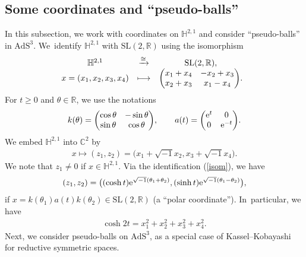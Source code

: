 \documentclass[pdftex]{sigma}
\numberwithin{equation}{section}
\begin{document}
\subsection{Some coordinates and ``pseudo-balls''}
In this subsection, we work with coordinates on $\mathbb{H}^{2,1}$ and
consider ``pseudo-balls'' in $\mathrm{AdS}^{3}$. We~identify
$\mathbb{H}^{2,1}$ with $\mathrm{SL}(2,\mathbb{R})$ using the isomorphism
\begin{align}
\begin{array}{@{}ccc}
\mathbb{H}^{2,1} & \xrightarrow{\cong} & \mathrm{SL}(2,\mathbb{R}), \\
x=(x_1,x_2,x_3,x_4) & \longmapsto & \begin{pmatrix}
x_1 + x_4 & -x_2 + x_3 \\
x_2 + x_3 & x_1 -x_4
\end{pmatrix}\!.\label{isom}
\end{array}
\end{align}
For $t\geq0$ and $\theta\in\mathbb{R}$, we use the notations
\begin{gather}
\label{k-a}
k(\theta) = \begin{pmatrix}
\cos\theta & -\sin\theta \\
\sin\theta & \cos\theta
\end{pmatrix}\!,\qquad
a(t) = \begin{pmatrix}
{\rm e}^t & 0 \\
0 & {\rm e}^{-t}
\end{pmatrix}\!.
\end{gather}
We embed $\mathbb{H}^{2,1}$ into $\mathbb{C}^{2}$ by
\begin{gather}
\label{embed}
x\mapsto (z_1,z_2) = \big(x_1 + \sqrt{-1}x_2, x_3 + \sqrt{-1}x_4\big).
\end{gather}
We note that $z_{1}\neq0$ if $x\in\mathbb{H}^{2,1}$.
Via the identification (\ref{isom}), we have
\begin{gather}
\label{polar}
(z_1,z_2) = \big((\cosh t){\rm e}^{\sqrt{-1}(\theta_1+\theta_2)},
(\sinh t){\rm e}^{\sqrt{-1}(\theta_1-\theta_2)}\big),
\end{gather}
if $x = k(\theta_1)a(t)k(\theta_2) \in \mathrm{SL}(2,\mathbb{R})$
(a ``polar coordinate''). In~particular, we have
\begin{gather*}
\cosh 2t = x_1^2 + x_2^2 + x_3^2 + x_4^2.
\end{gather*}
Next, we consider pseudo-balls on $\mathrm{AdS}^3$, as a special case of
Kassel--Kobayashi~\cite{KaKob16} for
reductive symmetric spaces.
\end{document}
